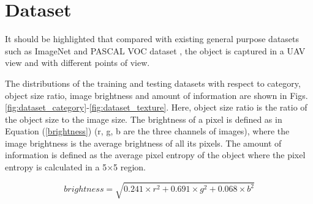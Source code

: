 \documentclass[10pt,journal,compsoc]{IEEEtran}
\begin{document}


\section{Dataset}\label{dataset}

{}
It should be highlighted that compared with existing general purpose datasets such as ImageNet \cite{russakovsky2015imagenet} and  PASCAL VOC dataset \cite{everingham2010pascal},  the object is captured in a UAV view and with different points of view.

The distributions of the training and testing datasets with respect to category, object size ratio, image brightness and amount of information are shown in Figs. \ref{fig:dataset_category}-\ref{fig:dataset_texture}.
Here, object size ratio is the ratio of the object size to the image size.
The brightness of a pixel is defined as in Equation (\ref{brightness})\cite{sanmorino2012clustering} (r, g, b are the three channels of images), where the image brightness is the average brightness of all its pixels.
The amount of information is defined as the average pixel entropy of the object where the pixel entropy is calculated in a 5$\times$5 region.

\begin{equation}\label{brightness}
brightness = \sqrt{0.241\times r^2+0.691\times g^2+0.068\times b^2}
\end{equation}
\end{document}
